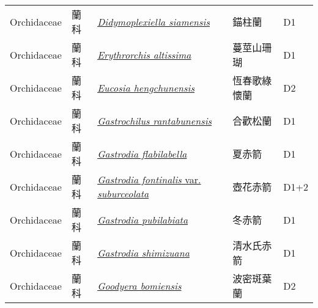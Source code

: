 {\begin{longtable}{p{2.5cm}p{2.5cm}p{4.5cm}p{2.5cm}p{3cm}}
    Orchidaceae & 蘭科 & \href{http://www.theplantlist.org/tpl1.1/search?q=Didymoplexiella+siamensis}{\textit{Didymoplexiella siamensis} } & 錨柱蘭 & D1 \index{Didymoplexiella@\textit{Didymoplexiella}!siamensis@\textit{siamensis}}  \index{錨柱蘭} \\
    Orchidaceae & 蘭科 & \href{http://www.theplantlist.org/tpl1.1/search?q=Erythrorchis+altissima}{\textit{Erythrorchis altissima} } & 蔓莖山珊瑚 & D1 \index{Erythrorchis@\textit{Erythrorchis}!altissima@\textit{altissima}}  \index{蔓莖山珊瑚} \\
    Orchidaceae & 蘭科 & \href{http://www.theplantlist.org/tpl1.1/search?q=Eucosia+hengchunensis}{\textit{Eucosia hengchunensis} } & 恆春歌綠懷蘭 & D2 \index{Eucosia@\textit{Eucosia}!hengchunensis@\textit{hengchunensis}}  \index{恆春歌綠懷蘭} \\
    Orchidaceae & 蘭科 & \href{http://www.theplantlist.org/tpl1.1/search?q=Gastrochilus+rantabunensis}{\textit{Gastrochilus rantabunensis} } & 合歡松蘭 & D1 \index{Gastrochilus@\textit{Gastrochilus}!rantabunensis@\textit{rantabunensis}}  \index{合歡松蘭} \\
    Orchidaceae & 蘭科 & \href{http://www.theplantlist.org/tpl1.1/search?q=Gastrodia+flabilabella}{\textit{Gastrodia flabilabella} } & 夏赤箭 & D1 \index{Gastrodia@\textit{Gastrodia}!flabilabella@\textit{flabilabella}}  \index{夏赤箭} \\
    Orchidaceae & 蘭科 & \href{http://www.theplantlist.org/tpl1.1/search?q=Gastrodia+fontinalis+var.+suburceolata}{\textit{Gastrodia fontinalis} var. \textit{suburceolata} } & 壺花赤箭 & D1+2 \index{Gastrodia@\textit{Gastrodia}!fontinalis@\textit{fontinalis}!var. suburceolata@var. \textit{suburceolata}}  \index{壺花赤箭} \\
    Orchidaceae & 蘭科 & \href{http://www.theplantlist.org/tpl1.1/search?q=Gastrodia+pubilabiata}{\textit{Gastrodia pubilabiata} } & 冬赤箭 & D1 \index{Gastrodia@\textit{Gastrodia}!pubilabiata@\textit{pubilabiata}}  \index{冬赤箭} \\
    Orchidaceae & 蘭科 & \href{http://www.theplantlist.org/tpl1.1/search?q=Gastrodia+shimizuana}{\textit{Gastrodia shimizuana} } & 清水氏赤箭 & D1 \index{Gastrodia@\textit{Gastrodia}!shimizuana@\textit{shimizuana}}  \index{清水氏赤箭} \\
    Orchidaceae & 蘭科 & \href{http://www.theplantlist.org/tpl1.1/search?q=Goodyera+bomiensis}{\textit{Goodyera bomiensis} } & 波密斑葉蘭 & D2 \index{Goodyera@\textit{Goodyera}!bomiensis@\textit{bomiensis}}  \index{波密斑葉蘭} \\

\end{longtable}}

